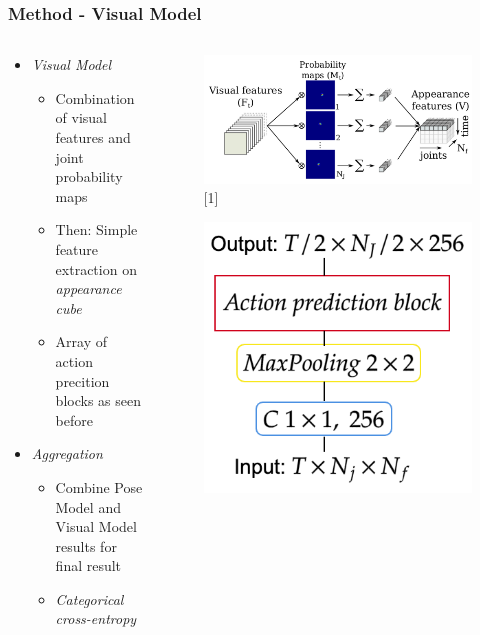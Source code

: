 \documentclass[9pt]{beamer}
\providecommand{\sourcefix}[1]{\\ \footnotesize \tugreen{Source:} [#1]}
\newenvironment{myframe}[1][]{%
\begin{frame}%
\frametitle{#1}
\setcounter{footnote}{0}


}{%
\end{frame}%
}
\begin{document}
\begin{myframe}[Method - Visual Model]
    	\begin{columns}[T]
        \begin{column}{.45\textwidth}
            \begin{itemize}
                \item \textit{Visual Model}
                \begin{itemize}
                    \item Combination of visual features and joint probability maps
                    \item Then: Simple feature extraction on \textit{appearance cube}
                    \item Array of action precition blocks as seen before
                \end{itemize}
                \item \textit{Aggregation}
                \begin{itemize}
                    \item Combine Pose Model and Visual Model results for final result
                    \item \textit{Categorical cross-entropy}
                \end{itemize}
            \end{itemize}
        \end{column}
        \begin{column}{.45\textwidth}
            \begin{figure}
                \includegraphics[width=.99\textwidth]{appearance-features.png}
                \sourcefix{1}
            \end{figure}
            \begin{figure}
                \includegraphics[width=.50\textwidth]{luvizon_appearancebasedaction.png}

\end{figure}
\end{column}
\end{columns}
\end{myframe}
\end{document}
